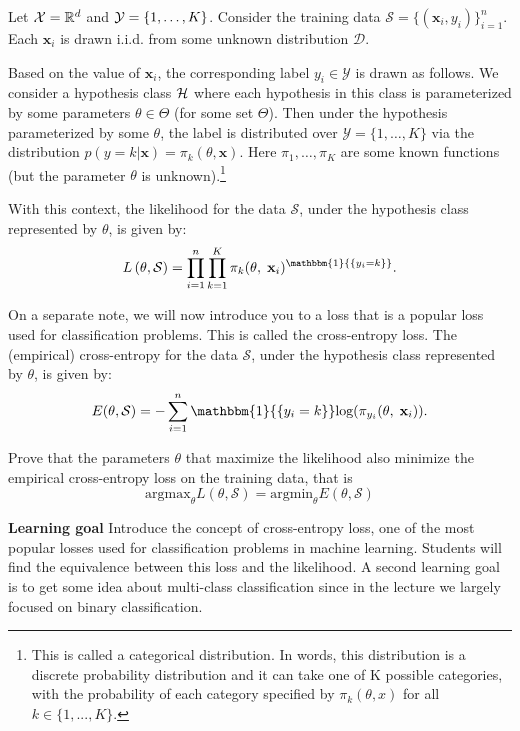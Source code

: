 \label{prb:final::prob1}

Let ${\cal X} = \mathbb{R}^{d}$ and ${\cal Y} = \{1,\dots,K\}$. Consider the 
training data $\mathcal{S} = \{ (\mathbf{x}_{i}, y_{i}) \}^{n}_{i=1}$. Each $\mathbf{x}_i$ is drawn i.i.d. from some unknown distribution $\mathcal{D}$. 


Based on the value of $\mathbf{x}_i$, the corresponding label $y_i \in \mathcal{Y}$ is drawn as follows. We consider a hypothesis class ${\cal H}$ where each hypothesis in this class is parameterized by some parameters $\theta \in \Theta$ (for some set $\Theta$). Then under the hypothesis parameterized by some $\theta$, the label is distributed over $\mathcal{Y} = \{1,\ldots,K\}$ via the distribution $p(y = k | \mathbf{x}) = \pi_k(\theta, \mathbf{x})$. Here $\pi_1,\ldots,\pi_K$ are some known functions (but the parameter $\theta$ is unknown).\footnote{This is called a categorical distribution. In words, this distribution is a discrete probability distribution and it can take one of K possible categories, with the probability of each category specified by $\pi_{k}(\theta, x)$ for all $k \in \{1,...,K\}$.}


With this context, the likelihood for the data $\mathcal{S}$, under the hypothesis class represented by $\theta$, is given by:
\begin{equation*}
\label{multinomial_maximum_likelihood_estimation}
L\left(\theta, \mathcal{S}\right) = \prod^{n}_{i=1} \prod^{K}_{k=1} \pi_{k}(\theta,\;\mathbf{x}_{i})^{\mathbbm{1}{\{y_{i}=k}\}} .
\end{equation*}

On a separate note, we will now introduce you to a loss that is a popular loss used for classification problems. This is called the cross-entropy loss. The (empirical) cross-entropy for the data $\mathcal{S}$, under the hypothesis class represented by $\theta$, is given by:
$$E(\theta, \mathcal{S}) = - \sum_{i=1}^n \mathbbm{1}{\{y_{i}=k\}} \text{log}(\pi_{y_i}(\theta,\;\mathbf{x}_{i})).$$

 
Prove that the parameters $\theta$ that maximize the likelihood also minimize the empirical cross-entropy loss on the training data, that is
$$\text{argmax}_\theta L(\theta, \mathcal{S}) = \text{argmin}_\theta E(\theta, \mathcal{S})$$


\textbf{Learning goal} Introduce the concept of cross-entropy loss, one of the most popular losses used for classification problems in machine learning. Students will find the equivalence between this loss and the likelihood. A second learning goal is to get some idea about multi-class classification since in the lecture we largely focused on binary classification.